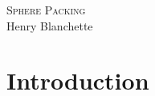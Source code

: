 \documentclass{article}
\begin{document}
\begin{center}
{\Large \textsc{Sphere Packing}} \\[2em]
{\large Henry Blanchette}
\end{center}

\vspace{2em}

\section{Introduction}
\end{document}
